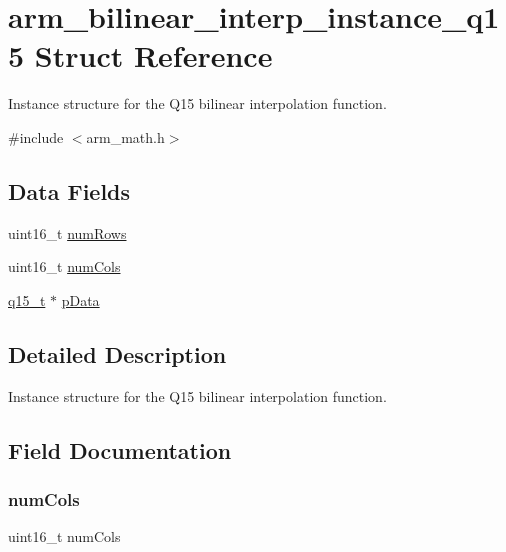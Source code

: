 \hypertarget{structarm__bilinear__interp__instance__q15}{}\section{arm\+\_\+bilinear\+\_\+interp\+\_\+instance\+\_\+q15 Struct Reference}
\label{structarm__bilinear__interp__instance__q15}


Instance structure for the Q15 bilinear interpolation function.  




{\ttfamily \#include $<$arm\+\_\+math.\+h$>$}

\subsection*{Data Fields}
\begin{DoxyCompactItemize}
\item 
uint16\+\_\+t \mbox{\hyperlink{structarm__bilinear__interp__instance__q15_a1bcf80ccdc2acc29198f1592ae300390}{num\+Rows}}
\item 
uint16\+\_\+t \mbox{\hyperlink{structarm__bilinear__interp__instance__q15_a4bb5ec0d13eb4c9cf887aa8366a44117}{num\+Cols}}
\item 
\mbox{\hyperlink{arm__math_8h_ab5a8fb21a5b3b983d5f54f31614052ea}{q15\+\_\+t}} $\ast$ \mbox{\hyperlink{structarm__bilinear__interp__instance__q15_a817ede38365e63e561a12069c6c5c087}{p\+Data}}
\end{DoxyCompactItemize}


\subsection{Detailed Description}
Instance structure for the Q15 bilinear interpolation function. 

\subsection{Field Documentation}
\mbox{\label{structarm__bilinear__interp__instance__q15_a4bb5ec0d13eb4c9cf887aa8366a44117}} 
\subsubsection{\texorpdfstring{numCols}{numCols}}
{\footnotesize\ttfamily uint16\+\_\+t num\+Cols}

